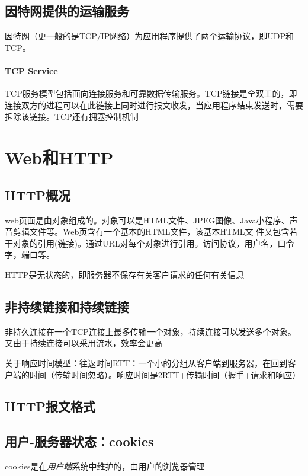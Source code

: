 \documentclass[]{report}
\begin{document}
		\subsection{因特网提供的运输服务}
		因特网（更一般的是TCP/IP网络）为应用程序提供了两个运输协议，即UDP和TCP。
		\paragraph{TCP Service}
		TCP服务模型包括面向连接服务和可靠数据传输服务。TCP链接是全双工的，即连接双方的进程可以在此链接上同时进行报文收发，当应用程序结束发送时，需要拆除该链接。TCP还有拥塞控制机制
	\section{Web和HTTP}
		\subsection{HTTP概况}
		web页面是由对象组成的。对象可以是HTML文件、JPEG图像、Java小程序、声 音剪辑文件等。Web页含有一个基本的HTML文件，该基本HTML文 件又包含若干对象的引用(链接)。通过URL对每个对象进行引用。访问协议，用户名，口令字，端口等。\par
		HTTP是无状态的，即服务器不保存有关客户请求的任何有关信息
		\subsection{非持续链接和持续链接}
		非持久连接在一个TCP连接上最多传输一个对象，持续连接可以发送多个对象。又由于持续连接可以采用流水，效率会更高\par
		关于响应时间模型：往返时间RTT：一个小的分组从客户端到服务器，在回到客户端的时间（传输时间忽略）。响应时间是2RTT+传输时间（握手+请求和响应）
		\subsection{HTTP报文格式}
		\subsection{用户-服务器状态：cookies}
		cookies是在\textit{用户端}系统中维护的，由用户的浏览器管理
\end{document}
